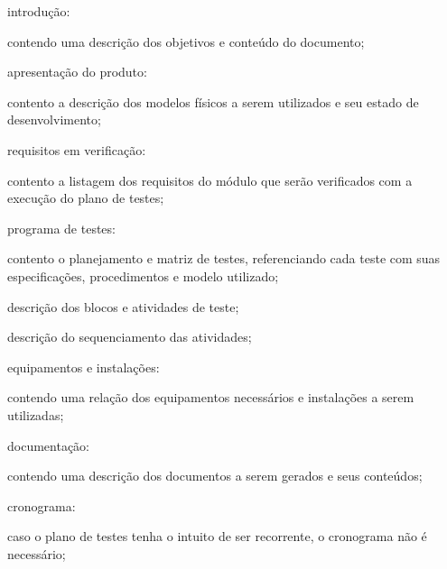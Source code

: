 \begin{alineas}
    \item introdução:
    \begin{alineas}
        \item contendo uma descrição dos objetivos e conteúdo do documento;
    \end{alineas}

    \item apresentação do produto:
    \begin{alineas}
        \item contento a descrição dos modelos físicos a serem utilizados e seu estado de desenvolvimento;
    \end{alineas}

    \item requisitos em verificação:
    \begin{alineas}
        \item contento a listagem dos requisitos do módulo que serão verificados com a execução do plano de testes;
    \end{alineas}

    \item programa de testes:
    \begin{alineas}
        \item contento o planejamento e matriz de testes, referenciando cada teste com suas especificações, procedimentos e modelo utilizado;
        \item descrição dos blocos e atividades de teste;
        \item descrição do sequenciamento das atividades;
    \end{alineas}

    \item equipamentos e instalações:
    \begin{alineas}
        \item contendo uma relação dos equipamentos necessários e instalações a serem utilizadas;
    \end{alineas}

    \item documentação:
    \begin{alineas}
        \item contendo uma descrição dos documentos a serem gerados e seus conteúdos;
    \end{alineas}

    \item cronograma:
    \begin{alineas}
        \item caso o plano de testes tenha o intuito de ser recorrente, o cronograma não é necessário;
    \end{alineas}

\end{alineas}

